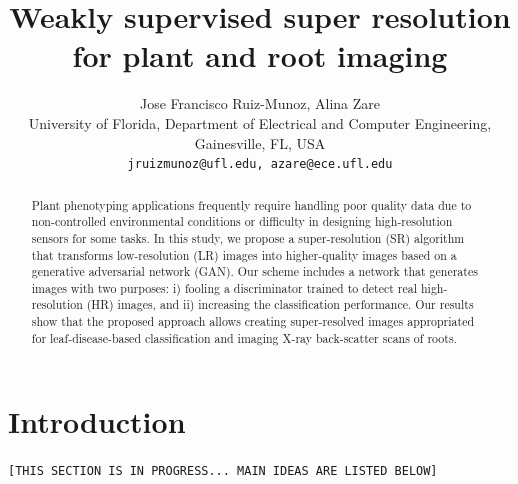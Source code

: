 \documentclass[10pt,twocolumn,letterpaper]{article}
\begin{document}
\title{Weakly supervised super resolution for plant and root imaging}

\author{Jose Francisco Ruiz-Munoz, Alina Zare \\
University of Florida, Department of Electrical and Computer Engineering, Gainesville, FL, USA\\
{\tt\small jruizmunoz@ufl.edu, azare@ece.ufl.edu}
}

\maketitle

\begin{abstract}
   Plant phenotyping applications frequently require handling poor quality data due to non-controlled environmental conditions or difficulty in designing high-resolution sensors for some tasks. In this study, we propose a super-resolution (SR) algorithm that transforms low-resolution (LR) images into higher-quality images based on a generative adversarial network (GAN). Our scheme includes a network that generates images with two purposes: i) fooling a discriminator trained to detect real high-resolution (HR) images, and ii) increasing the classification performance. Our results show that the proposed approach allows creating super-resolved images appropriated for leaf-disease-based classification and imaging X-ray back-scatter scans of roots.
\end{abstract}

\section{Introduction}

\texttt{[THIS SECTION IS IN PROGRESS... MAIN IDEAS ARE LISTED BELOW]}\\
\end{document}
